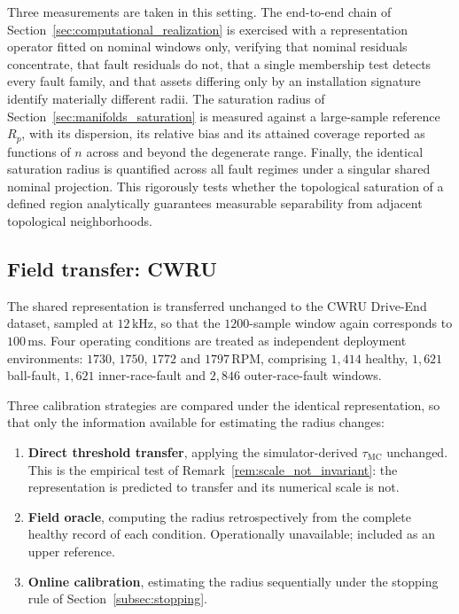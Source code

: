 \documentclass[a4paper]{cas-sc}
\newcommand{\taumc}{\ensuremath{\tau_{\mathrm{MC}}}}
\begin{document}
Three measurements are taken in this setting. The end-to-end chain of
Section~\ref{sec:computational_realization} is exercised with a
representation operator fitted on nominal windows only, verifying that
nominal residuals concentrate, that fault residuals do not, that a single
membership test detects every fault family, and that assets differing only by
an installation signature identify materially different radii. The saturation
radius of Section~\ref{sec:manifolds_saturation} is measured against a
large-sample reference \(R_p\), with its dispersion, its relative bias and its
attained coverage reported as functions of \(n\) across and beyond the
degenerate range. Finally, the identical saturation radius is quantified across all fault regimes under a singular shared nominal projection. This rigorously tests whether the topological saturation of a defined region analytically guarantees measurable separability from adjacent topological neighborhoods.

\subsection{Field transfer: CWRU}
\label{subsec:design_cwru}

The shared representation is transferred unchanged to the CWRU Drive-End
dataset, sampled at \(12\,\mathrm{kHz}\), so that the \(1200\)-sample window
again corresponds to \(100\,\mathrm{ms}\). Four operating conditions are
treated as independent deployment environments: \(1730\), \(1750\), \(1772\)
and \(1797\,\mathrm{RPM}\), comprising \(1{,}414\) healthy, \(1{,}621\)
ball-fault, \(1{,}621\) inner-race-fault and \(2{,}846\) outer-race-fault
windows.

Three calibration strategies are compared under the identical representation,
so that only the information available for estimating the radius changes:

\begin{enumerate}[leftmargin=1.8em]
\item \textbf{Direct threshold transfer}, applying the simulator-derived
      \(\taumc\) unchanged. This is the empirical test of
      Remark~\ref{rem:scale_not_invariant}: the representation is predicted to
      transfer and its numerical scale is not.
\item \textbf{Field oracle}, computing the radius retrospectively from the
      complete healthy record of each condition. Operationally unavailable;
      included as an upper reference.
\item \textbf{Online calibration}, estimating the radius sequentially under
      the stopping rule of Section~\ref{subsec:stopping}.
\end{enumerate}
\end{document}
